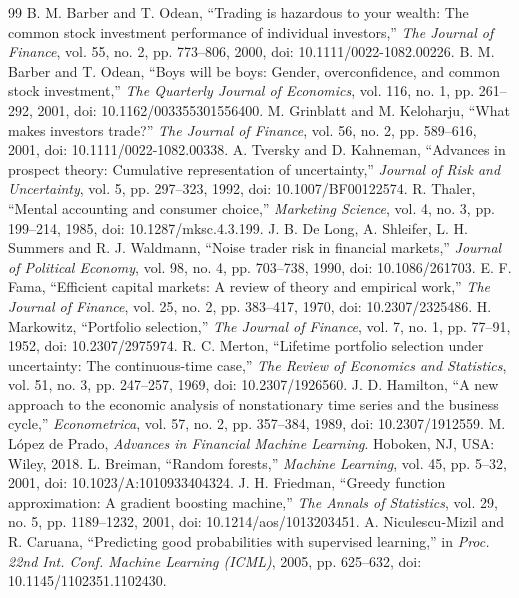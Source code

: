 \begin{thebibliography}{99}
 B. M. Barber and T. Odean, ``Trading is hazardous to your wealth: The common stock investment performance of individual investors,'' \textit{The Journal of Finance}, vol. 55, no. 2, pp. 773--806, 2000, doi: 10.1111/0022-1082.00226.
 B. M. Barber and T. Odean, ``Boys will be boys: Gender, overconfidence, and common stock investment,'' \textit{The Quarterly Journal of Economics}, vol. 116, no. 1, pp. 261--292, 2001, doi: 10.1162/003355301556400.
 M. Grinblatt and M. Keloharju, ``What makes investors trade?'' \textit{The Journal of Finance}, vol. 56, no. 2, pp. 589--616, 2001, doi: 10.1111/0022-1082.00338.
 A. Tversky and D. Kahneman, ``Advances in prospect theory: Cumulative representation of uncertainty,'' \textit{Journal of Risk and Uncertainty}, vol. 5, pp. 297--323, 1992, doi: 10.1007/BF00122574.
 R. Thaler, ``Mental accounting and consumer choice,'' \textit{Marketing Science}, vol. 4, no. 3, pp. 199--214, 1985, doi: 10.1287/mksc.4.3.199.
 J. B. De Long, A. Shleifer, L. H. Summers and R. J. Waldmann, ``Noise trader risk in financial markets,'' \textit{Journal of Political Economy}, vol. 98, no. 4, pp. 703--738, 1990, doi: 10.1086/261703.
 E. F. Fama, ``Efficient capital markets: A review of theory and empirical work,'' \textit{The Journal of Finance}, vol. 25, no. 2, pp. 383--417, 1970, doi: 10.2307/2325486.
 H. Markowitz, ``Portfolio selection,'' \textit{The Journal of Finance}, vol. 7, no. 1, pp. 77--91, 1952, doi: 10.2307/2975974.
 R. C. Merton, ``Lifetime portfolio selection under uncertainty: The continuous-time case,'' \textit{The Review of Economics and Statistics}, vol. 51, no. 3, pp. 247--257, 1969, doi: 10.2307/1926560.
 J. D. Hamilton, ``A new approach to the economic analysis of nonstationary time series and the business cycle,'' \textit{Econometrica}, vol. 57, no. 2, pp. 357--384, 1989, doi: 10.2307/1912559.
 M. López de Prado, \textit{Advances in Financial Machine Learning}. Hoboken, NJ, USA: Wiley, 2018.
 L. Breiman, ``Random forests,'' \textit{Machine Learning}, vol. 45, pp. 5--32, 2001, doi: 10.1023/A:1010933404324.
 J. H. Friedman, ``Greedy function approximation: A gradient boosting machine,'' \textit{The Annals of Statistics}, vol. 29, no. 5, pp. 1189--1232, 2001, doi: 10.1214/aos/1013203451.
 A. Niculescu-Mizil and R. Caruana, ``Predicting good probabilities with supervised learning,'' in \textit{Proc. 22nd Int. Conf. Machine Learning (ICML)}, 2005, pp. 625--632, doi: 10.1145/1102351.1102430.

\end{thebibliography}
